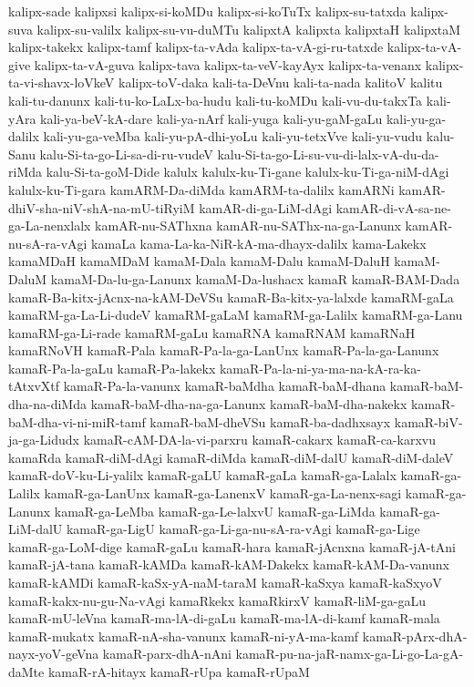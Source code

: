 {kalipx-sade
kalipxsi
kalipx-si-koMDu
kalipx-si-koTuTx
kalipx-su-tatxda
kalipx-suva
kalipx-su-valilx
kalipx-su-vu-duMTu
kalipxtA
kalipxta
kalipxtaH
kalipxtaM
kalipx-takekx
kalipx-tamf
kalipx-ta-vAda
kalipx-ta-vA-gi-ru-tatxde
kalipx-ta-vA-give
kalipx-ta-vA-guva
kalipx-tava
kalipx-ta-veV-kayAyx
kalipx-ta-venanx
kalipx-ta-vi-shavx-loVkeV
kalipx-toV-daka
kali-ta-DeVnu
kali-ta-nada
kalitoV
kalitu
kali-tu-danunx
kali-tu-ko-LaLx-ba-hudu
kali-tu-koMDu
kali-vu-du-takxTa
kali-yAra
kali-ya-beV-kA-dare
kali-ya-nArf
kali-yuga
kali-yu-gaM-gaLu
kali-yu-ga-dalilx
kali-yu-ga-veMba
kali-yu-pA-dhi-yoLu
kali-yu-tetxVve
kali-yu-vudu
kalu-Sanu
kalu-Si-ta-go-Li-sa-di-ru-vudeV
kalu-Si-ta-go-Li-su-vu-di-lalx-vA-du-da-riMda
kalu-Si-ta-goM-Dide
kalulx
kalulx-ku-Ti-gane
kalulx-ku-Ti-ga-niM-dAgi
kalulx-ku-Ti-gara
kamARM-Da-diMda
kamARM-ta-dalilx
kamARNi
kamAR-dhiV-sha-niV-shA-na-mU-tiRyiM
kamAR-di-ga-LiM-dAgi
kamAR-di-vA-sa-ne-ga-La-nenxlalx
kamAR-nu-SAThxna
kamAR-nu-SAThx-na-ga-Lanunx
kamAR-nu-sA-ra-vAgi
kamaLa
kama-La-ka-NiR-kA-ma-dhayx-dalilx
kama-Lakekx
kamaMDaH
kamaMDaM
kamaM-Dala
kamaM-Dalu
kamaM-DaluH
kamaM-DaluM
kamaM-Da-lu-ga-Lanunx
kamaM-Da-lushacx
kamaR
kamaR-BAM-Dada
kamaR-Ba-kitx-jAcnx-na-kAM-DeVSu
kamaR-Ba-kitx-ya-lalxde
kamaRM-gaLa
kamaRM-ga-La-Li-dudeV
kamaRM-gaLaM
kamaRM-ga-Lalilx
kamaRM-ga-Lanu
kamaRM-ga-Li-rade
kamaRM-gaLu
kamaRNA
kamaRNAM
kamaRNaH
kamaRNoVH
kamaR-Pala
kamaR-Pa-la-ga-LanUnx
kamaR-Pa-la-ga-Lanunx
kamaR-Pa-la-gaLu
kamaR-Pa-lakekx
kamaR-Pa-la-ni-ya-ma-na-kA-ra-ka-tAtxvXtf
kamaR-Pa-la-vanunx
kamaR-baMdha
kamaR-baM-dhana
kamaR-baM-dha-na-diMda
kamaR-baM-dha-na-ga-Lanunx
kamaR-baM-dha-nakekx
kamaR-baM-dha-vi-ni-miR-tamf
kamaR-baM-dheVSu
kamaR-ba-dadhxsayx
kamaR-biV-ja-ga-Lidudx
kamaR-cAM-DA-la-vi-parxru
kamaR-cakarx
kamaR-ca-karxvu
kamaRda
kamaR-diM-dAgi
kamaR-diMda
kamaR-diM-dalU
kamaR-diM-daleV
kamaR-doV-ku-Li-yalilx
kamaR-gaLU
kamaR-gaLa
kamaR-ga-Lalalx
kamaR-ga-Lalilx
kamaR-ga-LanUnx
kamaR-ga-LanenxV
kamaR-ga-La-nenx-sagi
kamaR-ga-Lanunx
kamaR-ga-LeMba
kamaR-ga-Le-lalxvU
kamaR-ga-LiMda
kamaR-ga-LiM-dalU
kamaR-ga-LigU
kamaR-ga-Li-ga-nu-sA-ra-vAgi
kamaR-ga-Lige
kamaR-ga-LoM-dige
kamaR-gaLu
kamaR-hara
kamaR-jAcnxna
kamaR-jA-tAni
kamaR-jA-tana
kamaR-kAMDa
kamaR-kAM-Dakekx
kamaR-kAM-Da-vanunx
kamaR-kAMDi
kamaR-kaSx-yA-naM-taraM
kamaR-kaSxya
kamaR-kaSxyoV
kamaR-kakx-nu-gu-Na-vAgi
kamaRkekx
kamaRkirxV
kamaR-liM-ga-gaLu
kamaR-mU-leVna
kamaR-ma-lA-di-gaLu
kamaR-ma-lA-di-kamf
kamaR-mala
kamaR-mukatx
kamaR-nA-sha-vanunx
kamaR-ni-yA-ma-kamf
kamaR-pArx-dhA-nayx-yoV-geVna
kamaR-parx-dhA-nAni
kamaR-pu-na-jaR-namx-ga-Li-go-La-gA-daMte
kamaR-rA-hitayx
kamaR-rUpa
kamaR-rUpaM
}
